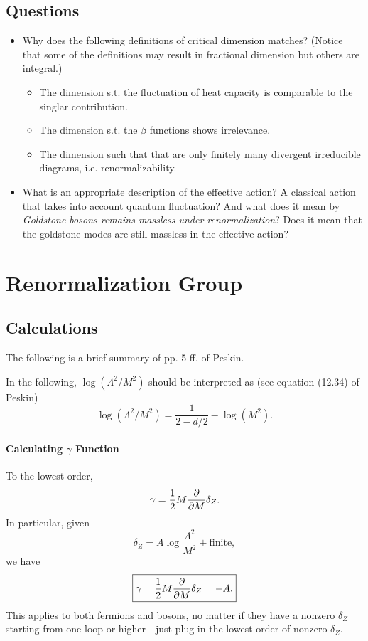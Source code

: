 \documentclass{article}
\begin{document}
\subsection{Questions}

\begin{itemize}
    \item Why does the following definitions of critical dimension matches?
    (Notice that some of the definitions may result in fractional dimension but others are integral.)
    \begin{itemize}
        \item The dimension s.t. the fluctuation of heat capacity is comparable to the singlar contribution.
        \item The dimension s.t. the $\beta$ functions shows irrelevance.
        \item The dimension such that that are only finitely many divergent irreducible diagrams, i.e. renormalizability.
    \end{itemize}
    \item What is an appropriate description of the effective action?
    A classical action that takes into account quantum fluctuation?
    And what does it mean by \textit{Goldstone bosons remains massless under renormalization}?
    Does it mean that the goldstone modes are still massless in the effective action?
\end{itemize}

\section{Renormalization Group}

\subsection{Calculations}

The following is a brief summary of pp. 5 ff. of Peskin.
\par
In the following, $\log(\Lambda^2/M^2)$ should be interpreted as (see equation (12.34) of Peskin)
\[ \log(\Lambda^2/M^2) = \frac{1}{2-d/2} - \log(M^2). \]

\paragraph{Calculating $\gamma$ Function}
To the lowest order,
\begin{equation}
    \label{eq:gamma_lowest_delta}
    \gamma = \frac{1}{2} M\pdv{M} \delta_Z.
\end{equation}
In particular, given
\[ \delta_Z = A \log \frac{\Lambda^2}{M^2} + \text{finite}, \]
we have
\begin{equation}
    \label{eq:gamma_lowest}
    \boxed{\gamma = \frac{1}{2} M\pdv{M} \delta_Z = -A.}
\end{equation}
This applies to both fermions and bosons, no matter if they have a nonzero $\delta_Z$ starting from one-loop or higher---just plug in the lowest order of nonzero $\delta_Z$.
\end{document}
